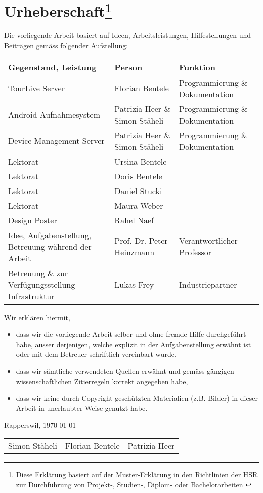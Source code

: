 \chapter*{Urheberschaft\footnote{Diese Erklärung basiert auf der Muster-Erklärung in den Richtlinien der HSR zur Durchführung
von Projekt-, Studien-, Diplom- oder Bachelorarbeiten \cite{hsrerklaerung}}}


Die vorliegende Arbeit basiert auf Ideen, Arbeitsleistungen, Hilfestellungen und Beiträgen gemäss folgender Aufstellung:

\begin{longtable}{p{4cm}|p{4cm}|p{4cm}}
\hline 
\textbf{Gegenstand, Leistung} & \textbf{Person} & \textbf{Funktion} \\ 
\hline 
\hline
TourLive Server & Florian Bentele & Programmierung \& Dokumentation \\ 
\hline 
Android Aufnahmesystem & Patrizia Heer \& Simon Stäheli & Programmierung \& Dokumentation \\ 
\hline 
Device Management Server & Patrizia Heer \& Simon Stäheli & Programmierung \& Dokumentation \\ 
\hline 
Lektorat & Ursina Bentele &  \\ 
\hline 
Lektorat & Doris Bentele &  \\ 
\hline 
Lektorat & Daniel Stucki &  \\ 
\hline 
Lektorat & Maura Weber &  \\ 
\hline
Design Poster & Rahel Naef &  \\ 
\hline  
Idee, Aufgabenstellung, Betreuung während der Arbeit & Prof. Dr. Peter Heinzmann & Verantwortlicher Professor \\
\hline
Betreuung \& zur Verfügungsstellung Infrastruktur & Lukas Frey & Industriepartner \\
\hline

\end{longtable} 

Wir erklären hiermit, 
\begin{itemize}
	\item dass wir die vorliegende Arbeit selber und ohne fremde Hilfe durchgeführt habe, ausser derjenigen, welche explizit in der Aufgabenstellung erwähnt ist oder mit dem Betreuer schriftlich vereinbart wurde,
	\item dass wir sämtliche verwendeten Quellen erwähnt und gemäss gängigen wissenschaftlichen Zitierregeln korrekt angegeben habe,
	\item dass wir keine durch Copyright geschützten Materialien (z.B. Bilder) in dieser Arbeit in unerlaubter Weise genutzt habe. 
\end{itemize}

Rapperswil, \today

\vspace{10 mm}
\begin{tabular*}{\textwidth}{c @{\extracolsep{\fill}} cc}
\hline
Simon Stäheli & Florian Bentele & Patrizia Heer \\
\end{tabular*}